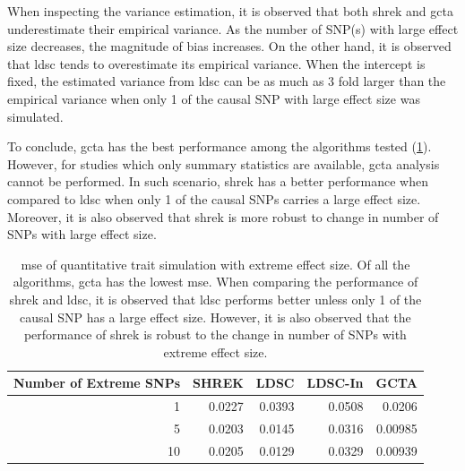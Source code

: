 		When inspecting the variance estimation, it is observed that both \gls{shrek} and \gls{gcta} underestimate their empirical variance. 
		As the number of \gls{SNP}(s) with large effect size decreases, the magnitude of bias increases.
		On the other hand, it is observed that \gls{ldsc} tends to overestimate its empirical variance. 
		When the intercept is fixed, the estimated variance from \gls{ldsc} can be as much as 3 fold larger than the empirical variance when only 1 of the causal \gls{SNP} with large effect size was simulated. 
		
		To conclude, \gls{gcta} has the best performance among the algorithms tested (\cref{tab:mseEx100c}).
		However, for studies which only summary statistics are available, \gls{gcta} analysis cannot be performed. 
		In such scenario, \gls{shrek} has a better performance when compared to \gls{ldsc} when only 1 of the causal \glspl{SNP} carries a large effect size.
		Moreover, it is also observed that \gls{shrek} is more robust to change in number of \glspl {SNP} with large effect size. 
		
		\begin{table}
			\centering
			\begin{tabular}{rrrrr}
				\toprule
				Number of Extreme SNPs&	SHREK&	LDSC&	LDSC-In&	GCTA \\
				\midrule
				1	&	0.0227	&	0.0393	&	0.0508	&	0.0206\\
				5	&	0.0203	&	0.0145	&	0.0316	&	0.00985\\
				10	&	0.0205	&	0.0129	&	0.0329	&	0.00939\\
				\bottomrule
			\end{tabular}
			\caption[MSE of Quantitative Trait Simulation with Extreme Effect Size]{
				\gls{mse} of quantitative trait simulation with extreme effect size.
				Of all the algorithms, \gls{gcta} has the lowest \gls{mse}.
				When comparing the performance of \gls{shrek} and \gls{ldsc}, it is observed that \gls{ldsc} performs better unless only 1 of the causal \gls{SNP} has a large effect size.
				However, it is also observed that the performance of \gls{shrek} is robust to the change in number of \glspl{SNP} with extreme effect size.
				}
			\label{tab:mseEx100c}
		\end{table}
		
